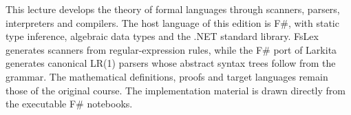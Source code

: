 This lecture develops the theory of formal languages through scanners, parsers, interpreters and compilers.
The host language of this edition is F\#, with static type inference, algebraic data types and the .NET standard library.
FsLex generates scanners from regular-expression rules, while the F\# port of Larkita generates canonical LR(1) parsers whose abstract syntax trees follow from the grammar.
The mathematical definitions, proofs and target languages remain those of the original course.
The implementation material is drawn directly from the executable F\# notebooks.
